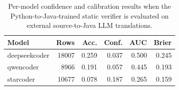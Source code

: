 \begin{table}[!htbp]
\centering
\scriptsize
\begin{tabular}{lrrrrr}
\toprule
Model & Rows & Acc. & Conf. & AUC & Brier \\
\midrule
deepseekcoder & 18007 & 0.259 & 0.037 & 0.500 & 0.245 \\
qwencoder & 8966 & 0.191 & 0.057 & 0.445 & 0.193 \\
starcoder & 10677 & 0.078 & 0.187 & 0.265 & 0.159 \\
\bottomrule
\end{tabular}
\vspace{0.5em}
\caption{Per-model confidence and calibration results when the Python-to-Java-trained static verifier is evaluated on external source-to-Java LLM translations.}
\label{tab:llm-calibration}
\end{table}

